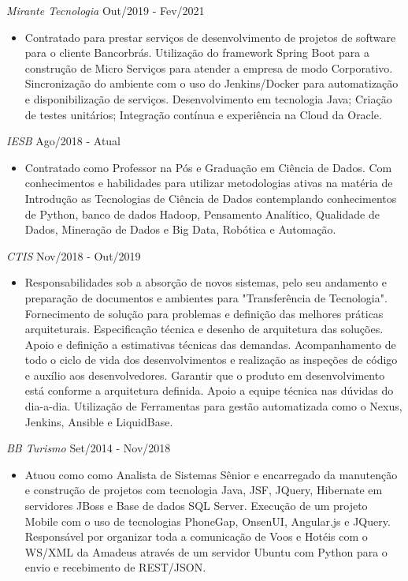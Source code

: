 \documentclass{res}
\begin{document}
\begin{resume}
		{\sl Mirante Tecnologia} \hfill Out/2019 - Fev/2021
		\begin{itemize}
			\item Contratado para prestar serviços de desenvolvimento de projetos de software para o cliente Bancorbrás. Utilização do framework Spring Boot para a construção de Micro Serviços para atender a empresa de modo Corporativo. Sincronização do ambiente com o uso do Jenkins/Docker para automatização e disponibilização de serviços. Desenvolvimento em tecnologia Java; Criação de testes unitários; Integração contínua e experiência na Cloud da Oracle. 
		\end{itemize}
		
		{\sl IESB} \hfill Ago/2018 - Atual
		\begin{itemize}
			\item Contratado como Professor na Pós e Graduação em Ciência de Dados. Com conhecimentos e habilidades para utilizar metodologias ativas na matéria de Introdução as Tecnologias de Ciência de Dados contemplando conhecimentos de Python, banco de dados Hadoop, Pensamento Analítico, Qualidade de Dados, Mineração de Dados e Big Data, Robótica e Automação.
		\end{itemize}
		
		{\sl CTIS} \hfill Nov/2018 - Out/2019
		\begin{itemize}
			\item Responsabilidades sob a absorção de novos sistemas, pelo seu andamento e preparação de documentos e ambientes para "Transferência de Tecnologia". Fornecimento de solução para problemas e definição das melhores práticas arquiteturais. Especificação técnica e desenho de arquitetura das soluções. Apoio e definição a estimativas técnicas das demandas. Acompanhamento de todo o ciclo de vida dos desenvolvimentos e realização as inspeções de código e auxílio aos desenvolvedores. Garantir que o produto em desenvolvimento está conforme a arquitetura definida. Apoio a equipe técnica nas dúvidas do dia-a-dia. Utilização de Ferramentas para gestão automatizada como o Nexus, Jenkins, Ansible e LiquidBase.
		\end{itemize}
		
		{\sl BB Turismo} \hfill Set/2014 - Nov/2018
		\begin{itemize}
			\item Atuou como como Analista de Sistemas Sênior e encarregado da manutenção e construção de projetos com tecnologia Java, JSF, JQuery, Hibernate em servidores JBoss e Base de dados SQL Server. Execução de um projeto Mobile com o uso de tecnologias PhoneGap, OnsenUI, Angular.js e JQuery. Responsável por organizar toda a comunicação de Voos e Hotéis com o WS/XML da Amadeus através de um servidor Ubuntu com Python para o envio e recebimento de REST/JSON.
		\end{itemize}
		

\end{resume}
\end{document}
